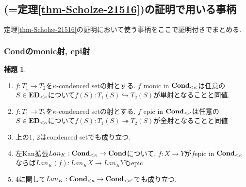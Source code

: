 \documentclass[dvipdfmx,a4paper,11pt]{article}
\theoremstyle{definition}
\newtheorem{lem}[thm]{補題}
\begin{document}
\subsection{\cite[Proposition 2.15, Theorem 2.16]{Sch19}(=定理\ref{thm-Scholze-21516})の証明で用いる事柄}
定理\ref{thm-Scholze-21516}の証明において使う事柄をここで証明付きでまとめる. 

 \subsubsection{{\bf Cond}のmonic射, epi射}

 
 \begin{tcolorbox}
 [colback = white, colframe = green!35!black, fonttitle = \bfseries,breakable = true]
 \begin{lem}\cite[Theorem 4.11.2, 4.11.3, 4.11.4]{Bar22}
 \label{lem-cond-epi}
 \text{}
 \begin{enumerate}
 \item $f : T_1 \to T_2$を$\kappa$-condenced setの射とする. $f$ monic in ${\bf Cond}_{<\kappa}$は任意の$S \in {\bf ED}_{<\kappa}$について$f(S) : T_1(S) \hookrightarrow T_2(S)$が単射となることと同値.
  \item $f : T_1 \to T_2$を$\kappa$-condenced setの射とする.
   $f$ epic in ${\bf Cond}_{<\kappa}$は任意の$S \in {\bf ED}_{<\kappa}$について$f(S) : T_1(S) \twoheadrightarrow T_2(S)$が全射となることと同値
  \item 上の1, 2はcondenced setでも成り立つ. 
  \item 左Kan拡張$Lan_{K} : {\bf Cond}_{<\kappa} \to {\bf Cond}$について, $f : X \to Y$が$f$epic in ${\bf Cond}_{<\kappa}$ならば$Lan_{K}(f) : Lan_{K}X \to Lan_{K}Y$もepic
  \item 4に関して$Lan_{K} : {\bf Cond}_{<\kappa} \to {\bf Cond}_{< \kappa'}$でも成り立つ. 
 \end{enumerate}
 \end{lem}
 \end{tcolorbox}
\end{document}
